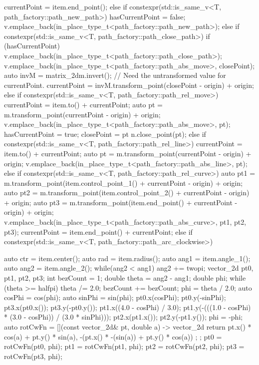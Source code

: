 \begin{codeblock}
{{{        currentPoint = item.end_point();
      }
      else if constexpr(std::is_same_v<T, path_factory::path_new_path>) {
        hasCurrentPoint = false;
        v.emplace_back(in_place_type_t<path_factory::path_new_path>);
      }
      else if constexpr(std::is_same_v<T, path_factory::path_close_path>) {
        if (hasCurrentPoint) {
          v.emplace_back(in_place_type_t<path_factory::path_close_path>);
          v.emplace_back(in_place_type_t<path_factory::path_abs_move>,
            closePoint);
          auto invM = matrix_2d{m}.invert();
          // Need the untransformed value for currentPoint.
          currentPoint = invM.transform_point(closePoint - origin) + origin;
        }
      }
      else if constexpr(std::is_same_v<T, path_factory::path_rel_move>) {
        currentPoint = item.to() + currentPoint;
        auto pt = m.transform_point(currentPoint - origin) + origin;
        v.emplace_back(in_place_type_t<path_factory::path_abs_move>, pt);
        hasCurrentPoint = true;
        closePoint = pt    
        n.close_point(pt);
      }
      else if constexpr(std::is_same_v<T, path_factory::path_rel_line>) {
        currentPoint = item.to() + currentPoint;
        auto pt = m.transform_point(currentPoint - origin) + origin;
        v.emplace_back(in_place_type_t<path_factory::path_abs_line>, pt);
      }
      else if constexpr(std::is_same_v<T, path_factory::path_rel_curve>) {
        auto pt1 = m.transform_point(item.control_point_1() + currentPoint -
        origin) + origin;
        auto pt2 = m.transform_point(item.control_point_2() + currentPoint -
        origin) + origin;
        auto pt3 = m.transform_point(item.end_point() + currentPoint - origin) +
        origin;
        v.emplace_back(in_place_type_t<path_factory::path_abs_curve>, pt1, pt2, pt3);
        currentPoint = item.end_point() + currentPoint;
      }
      else if constexpr(std::is_same_v<T, path_factory::path_arc_clockwise>) {
        auto ctr = item.center();
        auto rad = item.radius();
        auto ang1 = item.angle_1();
        auto ang2 = item.angle_2();
        while(ang2 < ang1) {
          ang2 += twopi;
        }
        vector_2d pt0, pt1, pt2, pt3;
        int bezCount = 1;
        double theta = ang2 - ang1;
        double phi;
        while (theta >= halfpi) {
          theta /= 2.0;
          bezCount += bezCount;
        }
        phi = theta / 2.0;
        auto cosPhi = cos(phi);
        auto sinPhi = sin(phi);
        pt0.x(cosPhi);
        pt0.y(-sinPhi);
        pt3.x(pt0.x());
        pt3.y(-pt0.y());
        pt1.x((4.0 - cosPhi) / 3.0);
        pt1.y(-(((1.0 - cosPhi) * (3.0 - cosPhi)) / (3.0 * sinPhi)));
        pt2.x(pt1.x());
        pt2.y(-pt1.y());
        phi = -phi;
        auto rotCwFn = [](const vector_2d& pt, double a) -> vector_2d {
          return { pt.x() * cos(a) + pt.y() * sin(a),
            -(pt.x() * -(sin(a)) + pt.y() * cos(a)) };
        };
        pt0 = rotCwFn(pt0, phi);
        pt1 = rotCwFn(pt1, phi);
        pt2 = rotCwFn(pt2, phi);
        pt3 = rotCwFn(pt3, phi);
        
}}}
\end{codeblock}
